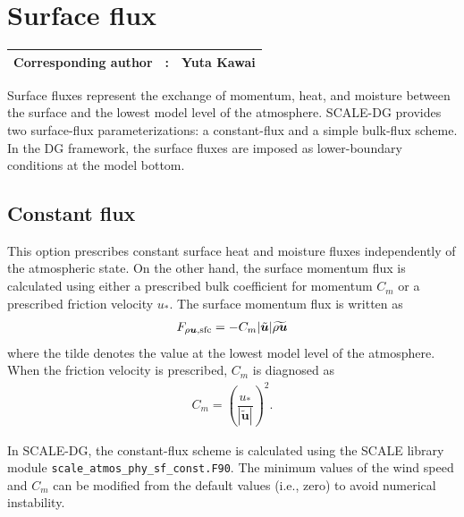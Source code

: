 \section{Surface flux}
{\bf \Large 
\begin{tabular}{ccc}
\hline
  Corresponding author & : & Yuta Kawai\\
\hline
\end{tabular}
}

Surface fluxes represent the exchange of momentum, heat, and moisture between the surface and the lowest model level of the atmosphere.
SCALE-DG provides two surface-flux parameterizations: a constant-flux and a simple bulk-flux scheme.
In the DG framework, the surface fluxes are imposed as lower-boundary conditions at the model bottom. 

\subsection{Constant flux}
This option prescribes constant surface heat and moisture fluxes independently of the atmospheric state.
On the other hand, the surface momentum flux is calculated 
using either a prescribed bulk coefficient for momentum $C_m$ or a prescribed friction velocity $u_*$. 
The surface momentum flux is written as
\begin{align}
  F_{\rho \bm{u},{\rm sfc}} = -C_m |\tilde{\bm{u}}| \widetilde{\rho \bm{u}}
\end{align}
where the tilde denotes the value at the lowest model level of the atmosphere. 
When the friction velocity is prescribed, $C_m$ is diagnosed as
\begin{align}
  C_m = \left(\dfrac{u_*}{|\tilde{\bm{u}}|}\right)^2.
\end{align}


In SCALE-DG, the constant-flux scheme is calculated using the SCALE library module {\tt scale\_atmos\_phy\_sf\_const.F90}. 
The minimum values of the wind speed and $C_m$ can be modified from the default values (i.e., zero) to avoid numerical instability.


